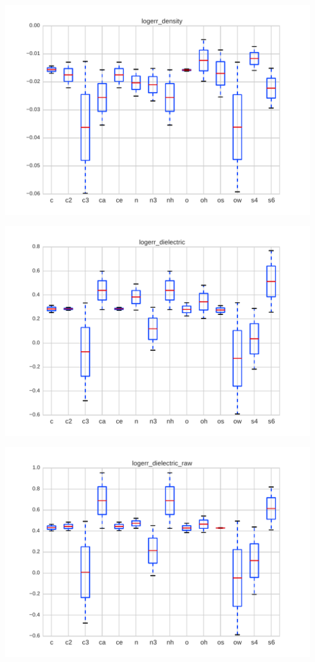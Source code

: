 \documentclass[aps,pre,twocolumn,superscriptaddress]{revtex4-1}
\begin{document}
\includegraphics[width=\columnwidth]{./figures/functional_group_logerr_density.pdf}

\includegraphics[width=\columnwidth]{./figures/functional_group_logerr_dielectric.pdf}

\includegraphics[width=\columnwidth]{./figures/functional_group_logerr_dielectric_raw.pdf}
\end{document}
